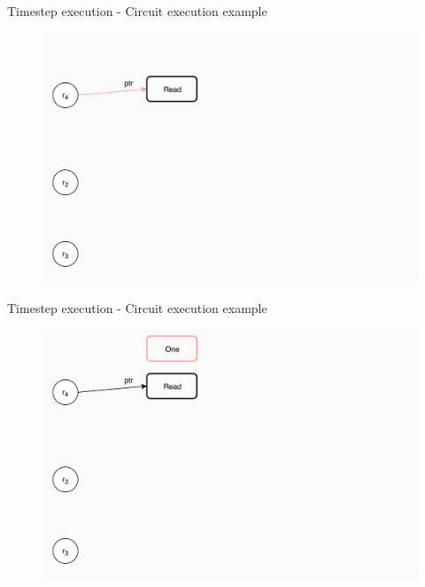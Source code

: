 \documentclass[xcolor={usenames}]{beamer}
\begin{document}
  \begin{frame}{Timestep execution - Circuit execution example}
  	\begin{figure}
  		\centering
  		\includegraphics[width=\textwidth]{../figures/example-circuit-2.png}
  	\end{figure}
  \end{frame}
  \begin{frame}{Timestep execution - Circuit execution example}
  	\begin{figure}
  		\centering
  		\includegraphics[width=\textwidth]{../figures/example-circuit-3.png}
  	\end{figure}
  \end{frame}
\end{document}
